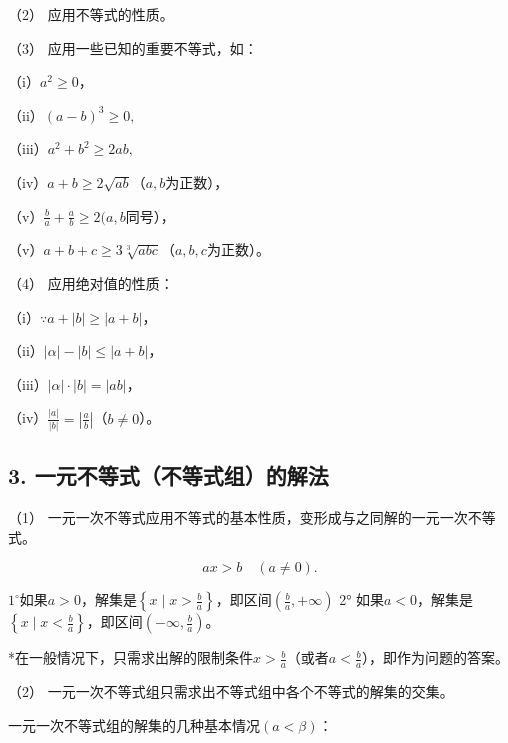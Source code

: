 （2） 应用不等式的性质。

（3） 应用一些已知的重要不等式，如：

（i）\(a^2 \geqslant 0\)，

（ii）\((a - b)^{3} \geqslant 0,\)

（iii）\(a^2 + b^2 \geqslant 2ab,\)

（iv）\(a + b \geqslant 2\sqrt{ab}\)（\(a, b\)为正数），

（v）\(\frac{b}{a} + \frac{a}{b} \geqslant 2 (a, b\)同号），

（v）\(a + b + c \geqslant 3\sqrt[3]{abc}\)（\(a, b, c\)为正数）。

（4） 应用绝对值的性质：

（i）\(\because a + |b| \geqslant |a + b|\)，

（ii）\(|\alpha| - |b| \leqslant |a + b|\)，

（iii）\(|\alpha| \cdot |b| = |ab|\)，

（iv）\(\frac{|a|}{|b|} = \left|\frac{a}{b}\right|\)（\(b \neq 0\)）。

\subsection{3. 一元不等式（不等式组）的解法}

（1）
一元一次不等式应用不等式的基本性质，变形成与之同解的一元一次不等式。

\[
a x > b \quad (a \neq 0).
\]

\(1^{\circ}\)如果\(a > 0\)，解集是\(\left\{x\mid x > \frac{b}{a}\right\}\)，即区间\(\left(\frac{b}{a}, + \infty\right)\)
2°
如果\(a < 0\)，解集是\(\left\{x \mid x < \frac{b}{a}\right\}\)，即区间\(\left(-\infty, \frac{b}{a}\right)\)。

*在一般情况下，只需求出解的限制条件\(x > \frac{b}{a}\)（或者\(a < \frac{b}{a}\)），即作为问题的答案。

（2） 一元一次不等式组只需求出不等式组中各个不等式的解集的交集。

一元一次不等式组的解集的几种基本情况\((a<\beta)\)：

